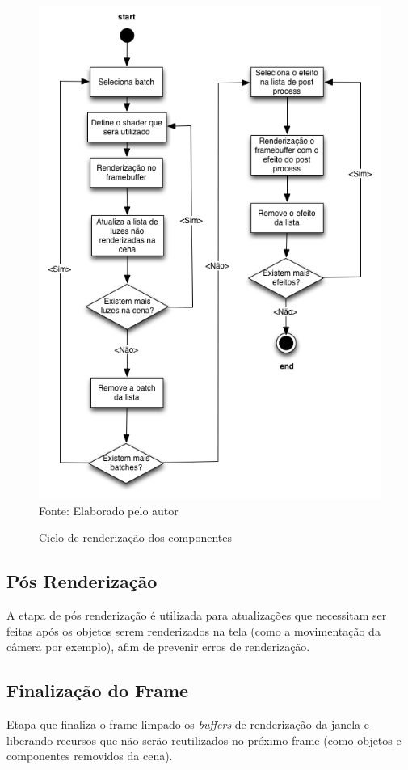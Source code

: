 \documentclass[12pt,	openright, twoside,	a4paper, english, french, spanish, brazil]{abntex2}
\begin{document}
\begin{figure}[H]
\centering
\caption{Ciclo de renderização dos componentes}
\includegraphics[width=12cm]{imagens/render.png}
\\
\small{Fonte: Elaborado pelo autor}
\label{figura:render}
\end{figure}

\subsection{Pós Renderização}
A etapa de pós renderização é utilizada para atualizações que necessitam ser feitas após os objetos serem renderizados na tela (como a movimentação da câmera por exemplo), afim de prevenir erros de renderização.

\subsection{Finalização do Frame}
Etapa que finaliza o frame limpado os \textit{buffers} de renderização da janela e liberando recursos que não serão reutilizados no próximo frame (como objetos e componentes removidos da cena).
\end{document}
